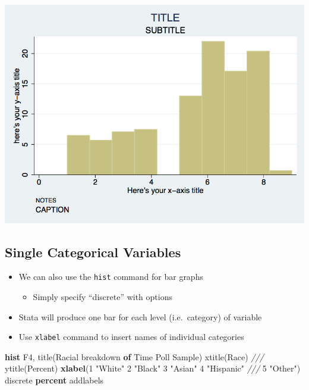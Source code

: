 \documentclass[
]{book}
\newenvironment{Shaded}{\begin{snugshade}}{\end{snugshade}}
\newcommand{\BaseNTok}[1]{\textcolor[rgb]{0.00,0.00,0.81}{#1}}
\newcommand{\CommentTok}[1]{\textcolor[rgb]{0.56,0.35,0.01}{\textit{#1}}}
\newcommand{\KeywordTok}[1]{\textcolor[rgb]{0.13,0.29,0.53}{\textbf{#1}}}
\newcommand{\NormalTok}[1]{#1}
\newcommand{\StringTok}[1]{\textcolor[rgb]{0.31,0.60,0.02}{#1}}
\providecommand{\tightlist}{%
  \setlength{\itemsep}{0pt}\setlength{\parskip}{0pt}}
\begin{document}
\includegraphics{Stata/StataModGraph/images/hist2.png}

\hypertarget{single-categorical-variables}{%
\subsection{Single Categorical Variables}\label{single-categorical-variables}}

\begin{itemize}
\tightlist
\item
  We can also use the \texttt{hist} command for bar graphs

  \begin{itemize}
  \tightlist
  \item
    Simply specify ``discrete'' with options
  \end{itemize}
\item
  Stata will produce one bar for each level (i.e.~category) of variable
\item
  Use \texttt{xlabel} command to insert names of individual categories
\end{itemize}

\begin{Shaded}
\begin{Highlighting}[]
  \KeywordTok{hist}\NormalTok{ F4, }\BaseNTok{title}\NormalTok{(Racial breakdown }\KeywordTok{of}\NormalTok{ Time Poll Sample) }\BaseNTok{xtitle}\NormalTok{(Race) }\CommentTok{///}
  \BaseNTok{ytitle}\NormalTok{(Percent) }\KeywordTok{xlabel}\NormalTok{(1 }\StringTok{"White"}\NormalTok{ 2 }\StringTok{"Black"}\NormalTok{ 3 }\StringTok{"Asian"}\NormalTok{ 4 }\StringTok{"Hispanic"} \CommentTok{///}
\NormalTok{   5 }\StringTok{"Other"}\NormalTok{) discrete }\KeywordTok{percent} \BaseNTok{addlabels}
\end{Highlighting}
\end{Shaded}
\end{document}
